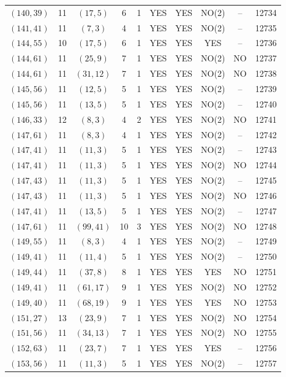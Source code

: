 \begin{longtable}{|c|c|c|c|c|c|c|c|c|c|}
$(140, 39)$ & 11 & $(17, 5)$ & 6 & 1 & YES & YES & NO(2) & -- & 12734\\
$(141, 41)$ & 11 & $(7, 3)$ & 4 & 1 & YES & YES & NO(2) & -- & 12735\\
$(144, 55)$ & 10 & $(17, 5)$ & 6 & 1 & YES & YES & YES & -- & 12736\\
$(144, 61)$ & 11 & $(25, 9)$ & 7 & 1 & YES & YES & NO(2) & NO & 12737\\
$(144, 61)$ & 11 & $(31, 12)$ & 7 & 1 & YES & YES & NO(2) & NO & 12738\\
$(145, 56)$ & 11 & $(12, 5)$ & 5 & 1 & YES & YES & NO(2) & -- & 12739\\
$(145, 56)$ & 11 & $(13, 5)$ & 5 & 1 & YES & YES & NO(2) & -- & 12740\\
$(146, 33)$ & 12 & $(8, 3)$ & 4 & 2 & YES & YES & NO(2) & NO & 12741\\
$(147, 61)$ & 11 & $(8, 3)$ & 4 & 1 & YES & YES & NO(2) & -- & 12742\\
$(147, 41)$ & 11 & $(11, 3)$ & 5 & 1 & YES & YES & NO(2) & -- & 12743\\
$(147, 41)$ & 11 & $(11, 3)$ & 5 & 1 & YES & YES & NO(2) & NO & 12744\\
$(147, 43)$ & 11 & $(11, 3)$ & 5 & 1 & YES & YES & NO(2) & -- & 12745\\
$(147, 43)$ & 11 & $(11, 3)$ & 5 & 1 & YES & YES & NO(2) & NO & 12746\\
$(147, 41)$ & 11 & $(13, 5)$ & 5 & 1 & YES & YES & NO(2) & -- & 12747\\
$(147, 61)$ & 11 & $(99, 41)$ & 10 & 3 & YES & YES & NO(2) & NO & 12748\\
$(149, 55)$ & 11 & $(8, 3)$ & 4 & 1 & YES & YES & NO(2) & -- & 12749\\
$(149, 41)$ & 11 & $(11, 4)$ & 5 & 1 & YES & YES & NO(2) & -- & 12750\\
$(149, 44)$ & 11 & $(37, 8)$ & 8 & 1 & YES & YES & YES & NO & 12751\\
$(149, 41)$ & 11 & $(61, 17)$ & 9 & 1 & YES & YES & NO(2) & NO & 12752\\
$(149, 40)$ & 11 & $(68, 19)$ & 9 & 1 & YES & YES & YES & NO & 12753\\
$(151, 27)$ & 13 & $(23, 9)$ & 7 & 1 & YES & YES & NO(2) & NO & 12754\\
$(151, 56)$ & 11 & $(34, 13)$ & 7 & 1 & YES & YES & NO(2) & NO & 12755\\
$(152, 63)$ & 11 & $(23, 7)$ & 7 & 1 & YES & YES & YES & -- & 12756\\
$(153, 56)$ & 11 & $(11, 3)$ & 5 & 1 & YES & YES & NO(2) & -- & 12757\\

\end{longtable}
